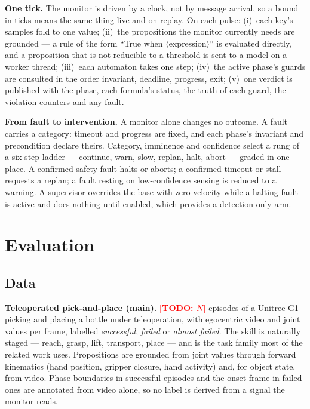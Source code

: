 \documentclass[letterpaper, 10pt, journal, twoside]{IEEEtran}
\newcommand{\TODO}[1]{\textcolor{red}{\textbf{[TODO: #1]}}}
\begin{document}
\textbf{One tick.} The monitor is driven by a clock, not by message
arrival, so a bound in ticks means the same thing live and on replay.
On each pulse: (i)~each key's samples fold to one value; (ii)~the
propositions the monitor currently needs are grounded --- a rule of the
form ``True when $\langle$expression$\rangle$'' is evaluated directly,
and a proposition that is not reducible to a threshold is sent to a
model on a worker thread; (iii)~each automaton takes one step; (iv)~the
active phase's guards are consulted in the order invariant, deadline,
progress, exit; (v)~one verdict is published with the phase, each
formula's status, the truth of each guard, the violation counters and
any fault.

\textbf{From fault to intervention.} A monitor alone changes no outcome.
A fault carries a category: timeout and progress are fixed, and each
phase's invariant and precondition declare theirs. Category, imminence
and confidence select a rung of a six-step ladder --- continue, warn,
slow, replan, halt, abort --- graded in one place. A confirmed safety
fault halts or aborts; a confirmed timeout or stall requests a replan; a
fault resting on low-confidence sensing is reduced to a warning. A
supervisor overrides the base with zero velocity while a halting fault
is active and does nothing until enabled, which provides a
detection-only arm.

\section{Evaluation}
\label{sec:eval}

\subsection{Data}

\textbf{Teleoperated pick-and-place (main).} \TODO{$N$} episodes of a
Unitree G1 picking and placing a bottle under teleoperation, with
egocentric video and joint values per frame, labelled \emph{successful},
\emph{failed} or \emph{almost failed}. The skill is naturally staged ---
reach, grasp, lift, transport, place --- and is the task family most of
the related work uses. Propositions are grounded from joint values
through forward kinematics (hand position, gripper closure, hand
activity) and, for object state, from video. Phase boundaries in
successful episodes and the onset frame in failed ones are annotated
from video alone, so no label is derived from a signal the monitor
reads.
\end{document}
